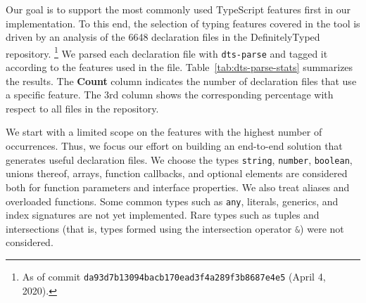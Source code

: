 \documentclass[sigconf]{acmart}
\begin{document}
Our goal is to support the  most commonly used TypeScript
features first in our implementation. To this end,
the selection of typing features covered in the tool is driven by
an analysis of the 6648 declaration files in
the DefinitelyTyped repository. \footnote{As of commit
  \texttt{da93d7b13094bacb170ead3f4a289f3b8687e4e5} (April 4, 2020).}
We parsed each declaration file with 
\texttt{dts-parse} and tagged it according to the features used in the file.
Table~\ref{tab:dts-parse-stats} summarizes the results.
The \textbf{Count} column indicates the number of declaration files that use a
specific feature. The 3rd column shows the corresponding
percentage with respect to all files in the repository. 

We start with a limited scope on the features with the highest number of
occurrences. Thus, we focus our effort on building an
end-to-end solution that generates useful declaration files. We choose
the types \texttt{string}, \texttt{number}, \texttt{boolean}, unions
thereof, arrays, function callbacks, and optional elements are considered
both for function parameters and interface properties. We also
treat aliases and overloaded functions.
Some common types such as \texttt{any}, literals, generics, and index
signatures are not yet implemented. 
Rare types such as tuples and intersections (that
is, types formed using the intersection operator
\lstinline[language=TypeScript]/&/) were not considered. 
\end{document}
